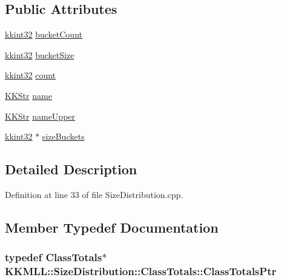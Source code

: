 \subsection*{Public Attributes}
\begin{DoxyCompactItemize}
\item 
\hyperlink{namespace_k_k_b_a8fa4952cc84fda1de4bec1fbdd8d5b1b}{kkint32} \hyperlink{class_size_distribution_1_1_class_totals_a207977a949ae5a9a96aa7b6a6ed999a6}{bucket\+Count}
\item 
\hyperlink{namespace_k_k_b_a8fa4952cc84fda1de4bec1fbdd8d5b1b}{kkint32} \hyperlink{class_size_distribution_1_1_class_totals_a822890416b62bdfc6877e85569e1ab9d}{bucket\+Size}
\item 
\hyperlink{namespace_k_k_b_a8fa4952cc84fda1de4bec1fbdd8d5b1b}{kkint32} \hyperlink{class_size_distribution_1_1_class_totals_a0b48bda46c5e908b4ab5511293837f3c}{count}
\item 
\hyperlink{class_k_k_b_1_1_k_k_str}{K\+K\+Str} \hyperlink{class_size_distribution_1_1_class_totals_a7653b3388a786c26c3ece3f5f92aabec}{name}
\item 
\hyperlink{class_k_k_b_1_1_k_k_str}{K\+K\+Str} \hyperlink{class_size_distribution_1_1_class_totals_a1115a9dcf8c7f776eda20e95d27e83fa}{name\+Upper}
\item 
\hyperlink{namespace_k_k_b_a8fa4952cc84fda1de4bec1fbdd8d5b1b}{kkint32} $\ast$ \hyperlink{class_size_distribution_1_1_class_totals_a61245bf9b17ab9b90d989ab4f8dd2fea}{size\+Buckets}
\end{DoxyCompactItemize}


\subsection{Detailed Description}


Definition at line 33 of file Size\+Distribution.\+cpp.



\subsection{Member Typedef Documentation}
\subsubsection[{\texorpdfstring{Class\+Totals\+Ptr}{ClassTotalsPtr}}]{\setlength{\rightskip}{0pt plus 5cm}typedef {\bf Class\+Totals}$\ast$ {\bf K\+K\+M\+L\+L\+::\+Size\+Distribution\+::\+Class\+Totals\+::\+Class\+Totals\+Ptr}}\hypertarget{class_size_distribution_1_1_class_totals_a2686de1099514e243ffe29eef7c0ed03}{}\label{class_size_distribution_1_1_class_totals_a2686de1099514e243ffe29eef7c0ed03}


